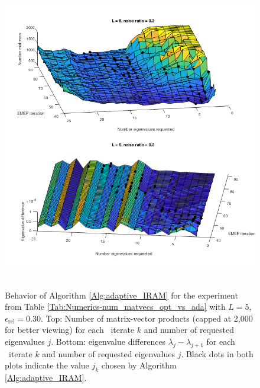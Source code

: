 \begin{figure}[H]
\centering
\hbox{\hspace{-0.5cm} \includegraphics[scale=0.65]{Numerics-surf_num_mvs_and_eig_diffs_2} }\vspace{0.0cm}
	\caption{Behavior of Algorithm \ref{Alg:adaptive_IRAM} for the experiment from Table \ref{Tab:Numerics-num_matvecs_opt_vs_ada} with $L=5$, $\epsilon_\text{rel}=0.30$.  Top: Number of matrix-vector products (capped at 2,000 for better viewing) for each \emep \ iterate $k$ and number of requested eigenvalues $j$. Bottom: eigenvalue differences $\lambda_j - \lambda_{j+1}$ for each \emep \ iterate $k$ and number of requested eigenvalues $j$.  Black dots in both plots indicate the value $j_k$ chosen by Algorithm \ref{Alg:adaptive_IRAM}.}
\label{Fig:Numerics-surf_mvs_eig_diffs_2}
\end{figure}





